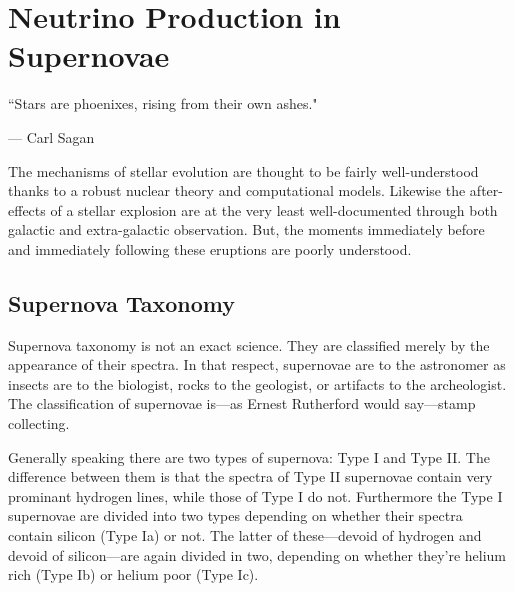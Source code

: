 %
%
%
%


\chapter{Neutrino Production in Supernovae}
	\label{supernovae_chapter}

	\vspace{-0.2in}

	\begin{quoting}
		\noindent \large ``Stars are phoenixes, rising from their own ashes." \normalsize

		--- Carl Sagan
	\end{quoting}

	 The mechanisms of stellar evolution are thought to be fairly well-understood thanks to a robust nuclear theory and computational models. Likewise the after-effects of a stellar explosion are at the very least well-documented through both galactic and extra-galactic observation. But, the moments immediately before and immediately following these eruptions are poorly understood. 
	
	\section{Supernova Taxonomy}
		Supernova taxonomy is not an exact science. They are classified merely by the appearance of their spectra. In that respect, supernovae are to the astronomer as insects are to the biologist, rocks to the geologist, or artifacts to the archeologist. The classification of supernovae is---as Ernest Rutherford would say---stamp collecting. 

		Generally speaking there are two types of supernova: Type I and Type II. The difference between them is that the spectra of Type II supernovae contain very prominant hydrogen lines, while those of Type I do not. Furthermore the Type I supernovae are divided into two types depending on whether their spectra contain silicon (Type Ia) or not. The latter of these---devoid of hydrogen and devoid of silicon---are again divided in two, depending on whether they're helium rich (Type Ib) or helium poor (Type Ic). 

